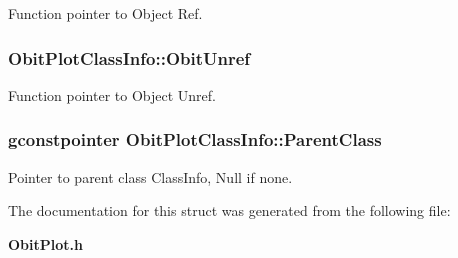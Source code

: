 Function pointer to Object Ref. 

\subsubsection{ {\bf Obit\-Plot\-Class\-Info::Obit\-Unref}}\label{structObitPlotClassInfo_o11}


Function pointer to Object Unref. 

\subsubsection{\setlength{\rightskip}{0pt plus 5cm}gconstpointer {\bf Obit\-Plot\-Class\-Info::Parent\-Class}}\label{structObitPlotClassInfo_o3}


Pointer to parent class Class\-Info, Null if none. 



The documentation for this struct was generated from the following file:\begin{CompactItemize}
\item 
{\bf Obit\-Plot.h}\end{CompactItemize}
